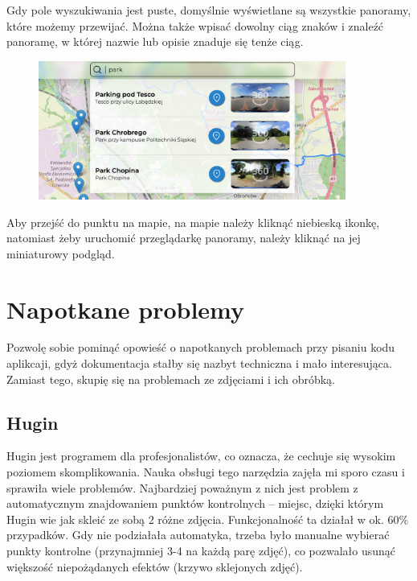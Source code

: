 \documentclass[a4paper]{mwart}
\begin{document}
Gdy pole wyszukiwania jest puste, domyślnie wyświetlane są wszystkie panoramy,
które możemy przewijać. Można także wpisać dowolny ciąg znaków i znaleźć
panoramę, w której nazwie lub opisie znaduje się tenże ciąg.
\begin{figure}[H]
\centering
\includegraphics[width=0.9\textwidth]{images/search_query.jpg}
\end{figure}

Aby przejść do punktu na mapie, na mapie należy kliknąć niebieską ikonkę,
natomiast żeby uruchomić przeglądarkę panoramy, należy kliknąć na jej
miniaturowy podgląd.

\section{Napotkane problemy}
Pozwolę sobie pominąć opowieść o napotkanych problemach przy pisaniu kodu
aplikcaji, gdyż dokumentacja stałby się nazbyt techniczna i mało interesująca.
Zamiast tego, skupię się na problemach ze zdjęciami i ich obróbką.

\subsection{Hugin}
Hugin jest programem dla profesjonalistów, co oznacza, że cechuje się wysokim
poziomem skomplikowania. Nauka obsługi tego narzędzia zajęła mi sporo czasu i
sprawiła wiele problemów. Najbardziej poważnym z nich jest problem z
automatycznym znajdowaniem punktów kontrolnych -- miejsc, dzięki którym Hugin
wie jak skleić ze sobą 2 różne zdjęcia. Funkcjonalność ta działał w ok. 60\%
przypadków. Gdy nie podziałała automatyka, trzeba było manualne wybierać punkty
kontrolne (przynajmniej 3-4 na każdą parę zdjęć), co pozwalało usunąć większość
niepożądanych efektów (krzywo sklejonych zdjęć).

\end{document}
